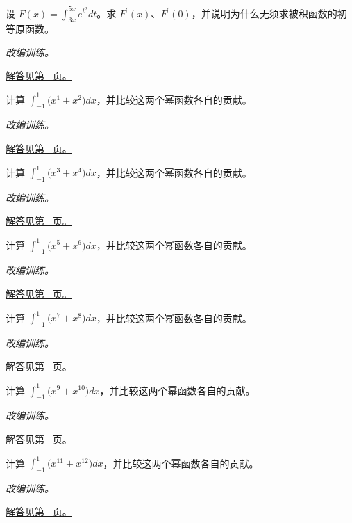 \documentclass[UTF8,12pt,a4paper,fontset=fandol]{ctexart}
\begin{document}
\begin{example}[两个积分端点都在变化]\label{ex:c17q14}
设 $F(x)=\displaystyle\int_{3x}^{5x}e^{t^2}dt$。求 $F^{\prime}(x)$、$F^{\prime}(0)$，并说明为什么无须求被积函数的初等原函数。
\par\textit{改编训练。}\par\hyperref[ans:c17q14]{解答见第~\pageref{ans:c17q14} 页。}
\end{example}
\begin{example}[对称区间上的奇偶分解]\label{ex:c17q15}
计算 $\displaystyle\int_{-1}^1\bigl(x^{1}+x^{2}\bigr)dx$，并比较这两个幂函数各自的贡献。
\par\textit{改编训练。}\par\hyperref[ans:c17q15]{解答见第~\pageref{ans:c17q15} 页。}
\end{example}
\begin{example}[对称区间上的奇偶分解]\label{ex:c17q16}
计算 $\displaystyle\int_{-1}^1\bigl(x^{3}+x^{4}\bigr)dx$，并比较这两个幂函数各自的贡献。
\par\textit{改编训练。}\par\hyperref[ans:c17q16]{解答见第~\pageref{ans:c17q16} 页。}
\end{example}
\begin{example}[对称区间上的奇偶分解]\label{ex:c17q17}
计算 $\displaystyle\int_{-1}^1\bigl(x^{5}+x^{6}\bigr)dx$，并比较这两个幂函数各自的贡献。
\par\textit{改编训练。}\par\hyperref[ans:c17q17]{解答见第~\pageref{ans:c17q17} 页。}
\end{example}
\begin{example}[对称区间上的奇偶分解]\label{ex:c17q18}
计算 $\displaystyle\int_{-1}^1\bigl(x^{7}+x^{8}\bigr)dx$，并比较这两个幂函数各自的贡献。
\par\textit{改编训练。}\par\hyperref[ans:c17q18]{解答见第~\pageref{ans:c17q18} 页。}
\end{example}
\begin{example}[对称区间上的奇偶分解]\label{ex:c17q19}
计算 $\displaystyle\int_{-1}^1\bigl(x^{9}+x^{10}\bigr)dx$，并比较这两个幂函数各自的贡献。
\par\textit{改编训练。}\par\hyperref[ans:c17q19]{解答见第~\pageref{ans:c17q19} 页。}
\end{example}
\begin{example}[对称区间上的奇偶分解]\label{ex:c17q20}
计算 $\displaystyle\int_{-1}^1\bigl(x^{11}+x^{12}\bigr)dx$，并比较这两个幂函数各自的贡献。
\par\textit{改编训练。}\par\hyperref[ans:c17q20]{解答见第~\pageref{ans:c17q20} 页。}
\end{example}
\end{document}
